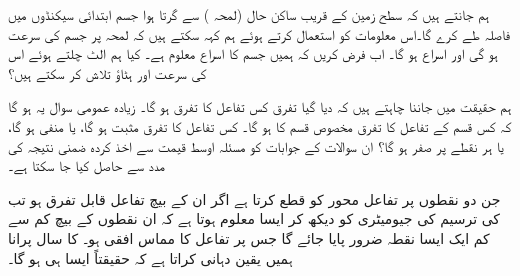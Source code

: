 
ہم جانتے ہیں کہ سطح زمین کے قریب  ساکن حال (لمحہ ) سے گرتا ہوا  جسم ابتدائی  سیکنڈوں میں    فاصلہ طے کرے گا۔اس معلومات کو استعمال کرتے ہوئے ہم کہہ سکتے ہیں کہ لمحہ  پر   جسم کی  سرعت  ہو گی اور اسراع
  ہو گا۔ اب فرض کریں کہ ہمیں جسم کا  اسراع معلوم ہے۔ کیا ہم الٹ چلتے ہوئے اس کی  سرعت اور ہٹاؤ تلاش کر سکتے ہیں؟

ہم حقیقت میں جاننا چاہتے ہیں کہ دیا گیا تفرق کس تفاعل کا  تفرق ہو گا۔ زیادہ عمومی سوال یہ ہو گا کہ کس قسم کے تفاعل کا تفرق مخصوص قسم کا ہو گا۔ کس تفاعل کا تفرق مثبت ہو گا، یا منفی ہو گا، یا ہر نقطے پر صفر ہو گا؟ ان سوالات کے جوابات کو مسئلہ اوسط قیمت سے اخذ کردہ  ضمنی نتیجہ  کی مدد سے حاصل کیا جا سکتا ہے۔


جن دو نقطوں پر تفاعل  محور  کو قطع  کرتا ہے اگر ان کے بیچ تفاعل قابل تفرق ہو تب  کی  ترسیم کی جیومیٹری کو دیکھ کر ایسا معلوم ہوتا ہے کہ ان نقطوں کے بیچ کم سے کم ایک ایسا نقطہ ضرور پایا جائے گا جس پر تفاعل کا مماس افقی ہو۔   کا  سال پرانا  ہمیں یقین دہانی کراتا ہے کہ حقیقتاً ایسا ہی ہو گا۔

